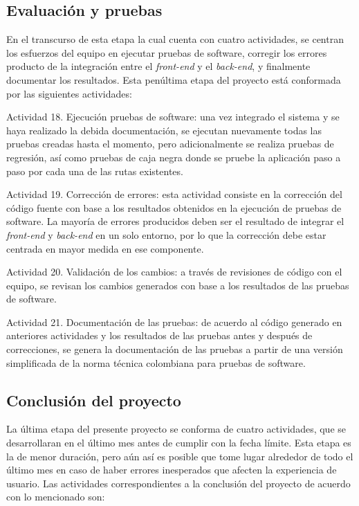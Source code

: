 \subsection{Evaluación y pruebas}
En el transcurso de esta etapa la cual cuenta con cuatro actividades, se centran los esfuerzos del equipo en ejecutar pruebas de software, corregir los errores producto de la integración entre el \textit{front-end} y el \textit{back-end}, y finalmente documentar los resultados. Esta penúltima etapa del proyecto está conformada por las siguientes actividades:

\begin{APAitemize}
    \item Actividad 18. Ejecución pruebas de software: una vez integrado el sistema y se haya realizado la debida documentación, se ejecutan nuevamente todas las pruebas creadas hasta el momento, pero adicionalmente se realiza pruebas de regresión, así como pruebas de caja negra donde se pruebe la aplicación paso a paso por cada una de las rutas existentes.
    \item Actividad 19. Corrección de errores: esta actividad consiste en la corrección del código fuente con base a los resultados obtenidos en la ejecución de pruebas de software. La mayoría de errores producidos deben ser el resultado de integrar el \textit{front-end} y \textit{back-end} en un solo entorno, por lo que la corrección debe estar centrada en mayor medida en ese componente.
    \item Actividad 20. Validación de los cambios: a través de revisiones de código con el equipo, se revisan los cambios generados con base a los resultados de las pruebas de software. 
    \item Actividad 21. Documentación de las pruebas: de acuerdo al código generado en anteriores actividades y los resultados de las pruebas antes y después de correcciones, se genera la documentación de las pruebas a partir de una versión simplificada de la norma técnica colombiana para pruebas de software.
\end{APAitemize}

\subsection{Conclusión del proyecto}
La última etapa del presente proyecto se conforma de cuatro actividades, que se desarrollaran en el último mes antes de cumplir con la fecha límite. Esta etapa es la de menor duración, pero aún así es posible que tome lugar alrededor de todo el último mes en caso de haber errores inesperados que afecten la experiencia de usuario. Las actividades correspondientes a la conclusión del proyecto de acuerdo con lo mencionado son:

